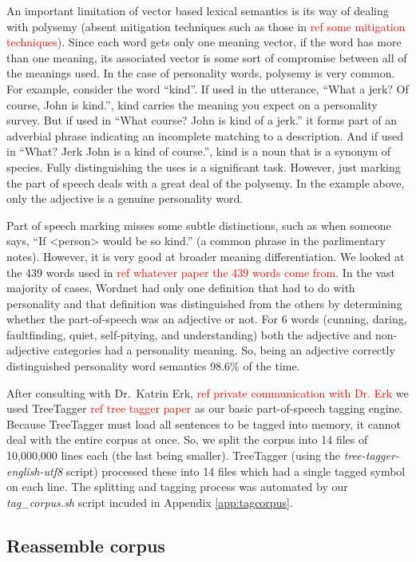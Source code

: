 \documentclass[10pt,letterpaper]{book}
\newcommand{\todo}[1]{\textcolor{red}{#1}}
\newcommand{\filename}[1]{\textit{#1}}
\begin{document}
An important limitation of vector based lexical semantics is its way of dealing with polysemy (absent mitigation techniques such as those in \todo{ref some mitigation techniques}). Since each word gets only one meaning vector, if the word has more than one meaning, its associated vector is some sort of compromise between all of the meanings used. In the case of personality words, polysemy is very common. For example, consider the word ``kind''. If used in the utterance, ``What a jerk? Of course, John is kind.'', kind carries the meaning you expect on a personality survey. But if used in ``What course? John is kind of a jerk.'' it forms part of an adverbial phrase indicating an incomplete matching to a description. And if used in ``What? Jerk John is a kind of course.'', kind is a noun that is a synonym of species. Fully distinguishing the uses is a significant task. However, just marking the part of speech deals with a great deal of the polysemy. In the example above, only the adjective is a genuine personality word. 

Part of speech marking misses some subtle distinctions, such as when someone says, ``If <person> would be so kind.'' (a common phrase in the parlimentary notes). However, it is very good at broader meaning differentiation. We looked at the 439 words used in \todo{ref whatever paper the 439 words come from}. In the vast majority of cases, Wordnet had only one definition that had to do with personality and that definition was distinguished from the others by determining whether the part-of-speech was an adjective or not. For 6 words (cunning, daring, faultfinding, quiet, self-pitying, and understanding) both the adjective and non-adjective categories had a personality meaning. So, being an adjective correctly distinguished personality word semantics 98.6\% of the time.

After consulting with Dr.\ Katrin Erk, \todo{ref private communication with Dr. Erk} we used TreeTagger \todo{ref tree tagger paper} as our basic part-of-speech tagging engine. Because TreeTagger must load all sentences to be tagged into memory, it cannot deal with the entire corpus at once. So, we split the corpus into 14 files of 10,000,000 lines each (the last being smaller). TreeTagger (using the \filename{tree-tagger-english-utf8} script) processed these into 14 files which had a single tagged symbol on each line. The splitting and tagging process was automated by our \filename{tag\_corpus.sh} script incuded in Appendix \ref{app:tagcorpus}.

\subsection{Reassemble corpus}
\end{document}
